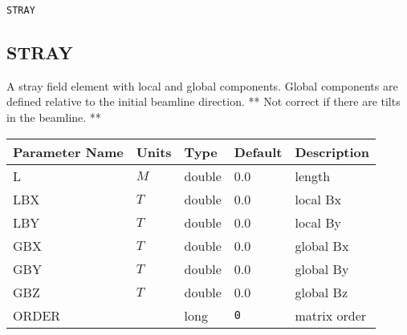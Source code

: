 \vspace*{0.5in}

\begin{latexonly}
\newpage
\begin{center}{\Large\verb|STRAY|}\end{center}
\end{latexonly}\subsection{STRAY}
A stray field element with local and global components.  Global components are
defined relative to the initial beamline direction.  ** Not correct if there are tilts
in the beamline. **
\\
\begin{tabular}{|l|l|l|l|p{\descwidth}|} \hline
Parameter Name & Units & Type & Default & Description \\ \hline 
L & $M$ & double &  0.0 & length  \\ \hline 
LBX & $T$ & double &  0.0 & local Bx  \\ \hline 
LBY & $T$ & double &  0.0 & local By  \\ \hline 
GBX & $T$ & double &  0.0 & global Bx  \\ \hline 
GBY & $T$ & double &  0.0 & global By  \\ \hline 
GBZ & $T$ & double &  0.0 & global Bz  \\ \hline 
ORDER &  & long &  \verb|0| & matrix order  \\ \hline 
\end{tabular}


